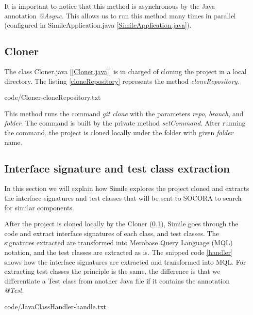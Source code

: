 It is important to notice that this method is asynchronous by the Java annotation \emph{@Async}. This allows us to run this method many times in parallel (configured in SimileApplication.java \ref{SimileApplication.java}).

\subsection{Cloner}
\label{simile:cloner}
The class Cloner.java [\ref{Cloner.java}] is in charged of cloning the project in a local directory. The listing \ref{cloneRepository} represents the method \emph{cloneRepository}.


{code/Cloner-cloneRepository.txt}

This method runs the command \emph{git clone} with the parameters \emph{repo}, \emph{branch}, and \emph{folder}. The command is built by the private method \emph{setCommand}. After running the command, the project is cloned locally under the folder with given \emph{folder} name.

\subsection{Interface signature and test class extraction}
\label{simile:code-analysis}
In this section we will explain how Simile explores the project cloned and extracts the interface signatures and test classes that will be sent to SOCORA to search for similar components.

After the project is cloned locally by the Cloner (\ref{simile:cloner}), Simile goes through the code and extract interface signatures of each class, and test classes. The signatures extracted are transformed into Merobase Query Language (MQL) notation, and the test classes are extracted as is. The snipped code \ref{handler} shows how the interface signatures are extracted and transformed into MQL. For extracting test classes the principle is the same, the difference is that we differentiate a Test class from another Java file if it contains the annotation \emph{@Test}.


{code/JavaClassHandler-handle.txt}

